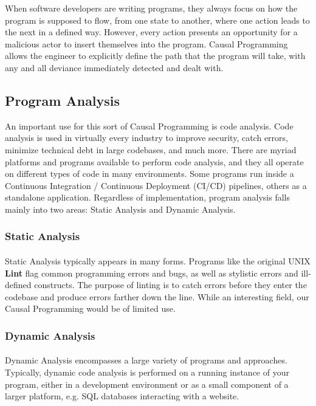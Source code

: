 \documentclass[runningheads]{llncs}
\begin{document}
When software developers are writing programs, they always focus on how the program is supposed to flow, from one state to another, where one action leads to the next in a defined way. However, every action presents an opportunity for a malicious actor to insert themselves into the program. Causal Programming allows the engineer to explicitly define the path that the program will take, with any and all deviance immediately detected and dealt with.


\subsection{Program Analysis}

An important use for this sort of Causal Programming is code analysis. Code analysis is used in virtually every industry to improve security, catch errors, minimize technical debt in large codebases, and much more. There are myriad platforms and programs available to perform code analysis, and they all operate on different types of code in many environments. Some programs run inside a Continuous Integration / Continuous Deployment (CI/CD) pipelines, others as a standalone application. Regardless of implementation, program analysis falls mainly into two areas: Static Analysis and Dynamic Analysis.

\subsubsection{Static Analysis}
\paragraph{}
Static Analysis typically appears in many forms. Programs like the original UNIX \textbf{Lint} flag common programming errors and bugs, as well as stylistic errors and ill-defined constructs. The purpose of linting is to catch errors before they enter the codebase and produce errors farther down the line. While an interesting field, our Causal Programming would be of limited use.

\subsubsection{Dynamic Analysis}

\paragraph{}
Dynamic Analysis encompasses a large variety of programs and approaches. Typically, dynamic code analysis is performed on a running instance of your program, either in a development environment or as a small component of a larger platform, e.g. SQL databases interacting with a website.
\end{document}

